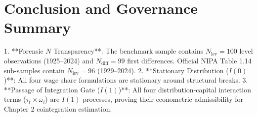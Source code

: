 \documentclass[11pt,a4paper]{article}
\begin{document}
\FloatBarrier
\section{Conclusion and Governance Summary}

1. **Forensic $N$ Transparency**: The benchmark sample contains $N_{\text{lev}} = 100$ level observations (1925--2024) and $N_{\text{diff}} = 99$ first differences. Official NIPA Table 1.14 sub-samples contain $N_{\text{lev}} = 96$ (1929--2024).
2. **Stationary Distribution ($I(0)$)**: All four wage share formulations are stationary around structural breaks.
3. **Passage of Integration Gate ($I(1)$)**: All four distribution-capital interaction terms ($\tau_t \times \omega_i$) are $I(1)$ processes, proving their econometric admissibility for Chapter 2 cointegration estimation.
\end{document}
